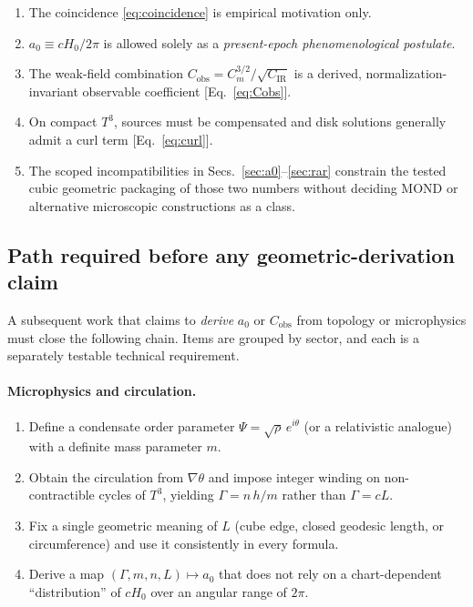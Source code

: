 \documentclass[aps,prd,reprint,superscriptaddress,nofootinbib,floatfix,showkeys]{revtex4-2}
\newcommand{\Tthree}{T^{3}}
\newcommand{\Cobs}{C_{\mathrm{obs}}}
\newcommand{\Cm}{C_{m}}
\newcommand{\CIR}{C_{\mathrm{IR}}}
\newcommand{\azero}{a_{0}}
\newcommand{\Hzero}{H_{0}}
\begin{document}
\begin{enumerate}
\item The coincidence \eqref{eq:coincidence} is empirical motivation only.
\item \(\azero\equiv c\Hzero/2\pi\) is allowed solely as a
  \emph{present-epoch phenomenological postulate}.
\item The weak-field combination
  \(\Cobs=\Cm^{3/2}/\sqrt{\CIR}\) is a derived, normalization-invariant
  observable coefficient [Eq.~\eqref{eq:Cobs}].
\item On compact \(\Tthree\), sources must be compensated and disk solutions
  generally admit a curl term [Eq.~\eqref{eq:curl}].
\item The scoped incompatibilities in Secs.~\ref{sec:a0}--\ref{sec:rar}
  constrain the tested cubic geometric packaging of those two numbers without
  deciding MOND or alternative microscopic constructions as a class.
\end{enumerate}

\subsection{Path required before any geometric-derivation claim}

A subsequent work that claims to \emph{derive} \(\azero\) or \(\Cobs\) from
topology or microphysics must close the following chain.  Items are grouped
by sector, and each is a separately testable technical requirement.

\paragraph{Microphysics and circulation.}
\begin{enumerate}
\item[(M1)] Define a condensate order parameter
  \(\Psi=\sqrt{\rho}\,e^{i\theta}\)
  (or a relativistic analogue) with a definite mass parameter \(m\).
\item[(M2)] Obtain the circulation from \(\nabla\theta\) and impose integer
  winding on non-contractible cycles of \(\Tthree\), yielding
  \(\Gamma=n\,h/m\) rather than \(\Gamma=cL\).
\item[(M3)] Fix a single geometric meaning of \(L\)
  (cube edge, closed geodesic length, or circumference) and use it
  consistently in every formula.
\item[(M4)] Derive a map
  \((\Gamma,m,n,L)\mapsto\azero\)
  that does not rely on a chart-dependent ``distribution'' of \(c\Hzero\) over
  an angular range of \(2\pi\).
\end{enumerate}
\end{document}
